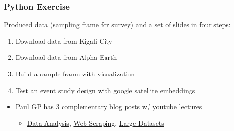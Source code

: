 \documentclass[aspectratio=169, 12pt]{beamer}
\newcommand{\ghLtwo}{https://tannerregan.github.io/GWU_AI_study_group/code/lecture_2/}
\begin{document}
\begin{frame}
\frametitle{Python Exercise}

Produced data (sampling frame for survey) and a \href{\ghLtwo/python_demo/4_slides_event_study.pdf}{set of slides} in four steps:
\begin{enumerate}
    \item Download data from Kigali City
    \item Download data from Alpha Earth
    \item Build a sample frame with visualization
    \item Test an event study design with google satellite embeddings
\end{enumerate}
\vfill\pause
\begin{itemize}
    \item Paul GP has 3 complementary blog posts w/ youtube lectures
    \begin{itemize}
        \item \href{https://paulgp.substack.com/p/from-an-empty-folder-to-a-figure}{Data Analysis}, \href{https://paulgp.substack.com/p/from-edgar-filings-to-a-structured}{Web Scraping}, \href{https://paulgp.substack.com/p/large-datasets-and-structured-databases}{Large Datasets}
    \end{itemize}
\end{itemize}
\end{frame}
\end{document}
